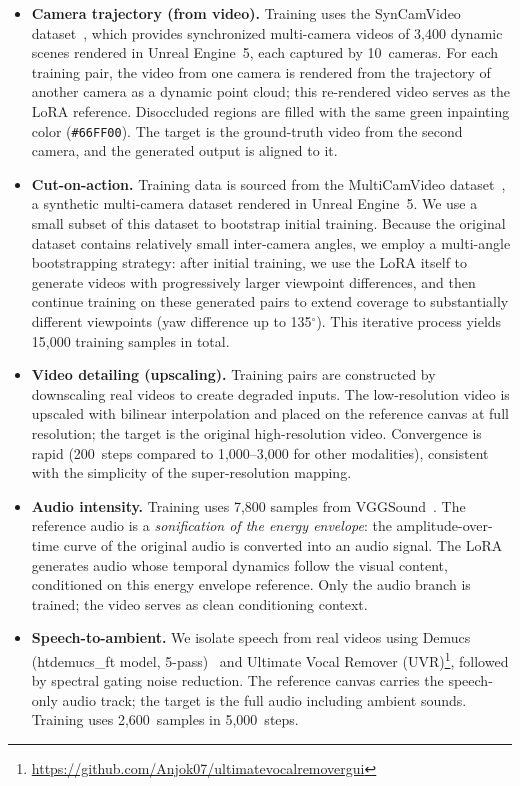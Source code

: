 \begin{itemize}
    \item \textbf{Camera trajectory (from video).} Training uses the SynCamVideo dataset~\cite{bai2024syncammaster}, which provides synchronized multi-camera videos of 3{,}400 dynamic scenes rendered in Unreal Engine~5, each captured by 10~cameras. For each training pair, the video from one camera is rendered from the trajectory of another camera as a dynamic point cloud; this re-rendered video serves as the LoRA reference. Disoccluded regions are filled with the same green inpainting color (\texttt{\#66FF00}). The target is the ground-truth video from the second camera, and the generated output is aligned to it.

    \item \textbf{Cut-on-action.} Training data is sourced from the MultiCamVideo dataset~\cite{bai2025recammaster}, a synthetic multi-camera dataset rendered in Unreal Engine~5. We use a small subset of this dataset to bootstrap initial training. Because the original dataset contains relatively small inter-camera angles, we employ a multi-angle bootstrapping strategy: after initial training, we use the LoRA itself to generate videos with progressively larger viewpoint differences, and then continue training on these generated pairs to extend coverage to substantially different viewpoints (yaw difference up to 135$^\circ$). This iterative process yields 15{,}000 training samples in total.

    \item \textbf{Video detailing (upscaling).} Training pairs are constructed by downscaling real videos to create degraded inputs. The low-resolution video is upscaled with bilinear interpolation and placed on the reference canvas at full resolution; the target is the original high-resolution video. Convergence is rapid (200~steps compared to 1{,}000--3{,}000 for other modalities), consistent with the simplicity of the super-resolution mapping.

    \item \textbf{Audio intensity.} Training uses 7{,}800 samples from VGGSound~\cite{chen2020vggsound}. The reference audio is a \emph{sonification of the energy envelope}: the amplitude-over-time curve of the original audio is converted into an audio signal. The LoRA generates audio whose temporal dynamics follow the visual content, conditioned on this energy envelope reference. Only the audio branch is trained; the video serves as clean conditioning context.

    \item \textbf{Speech-to-ambient.} We isolate speech from real videos using Demucs (htdemucs\_ft model, 5-pass)~\cite{rouard2023demucs} and Ultimate Vocal Remover (UVR)\footnote{\url{https://github.com/Anjok07/ultimatevocalremovergui}}, followed by spectral gating noise reduction. The reference canvas carries the speech-only audio track; the target is the full audio including ambient sounds. Training uses 2{,}600~samples in 5{,}000~steps.


\end{itemize}
